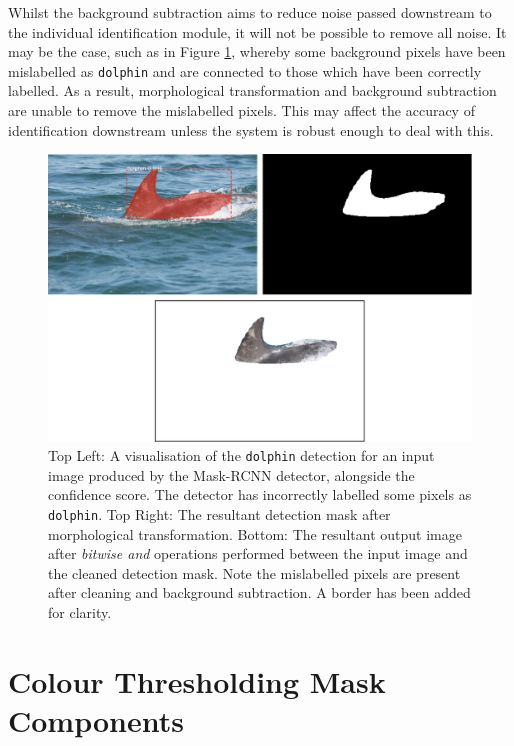 Whilst the background subtraction aims to reduce noise passed downstream to the individual identification module, it will not be possible to remove all noise. It may be the case, such as in Figure \ref{fig:fin-extraction-unclean}, whereby some background pixels have been mislabelled as \texttt{dolphin} and are connected to those which have been correctly labelled. As a result, morphological transformation and background subtraction are unable to remove the mislabelled pixels. This may affect the accuracy of identification downstream unless the system is robust enough to deal with this.

\begin{figure}
	\begin{center}
		\includegraphics[scale=0.5]{Chapter4/figs/fin-extraction-unclean-uncropped.png}
	\end{center}
	\caption{Top Left: A visualisation of the \texttt{dolphin} detection for an input image produced by the Mask-RCNN detector, alongside the confidence score. The detector has incorrectly labelled some pixels as \texttt{dolphin}. Top Right: The resultant detection mask after morphological transformation. Bottom: The resultant output image after \textit{bitwise and} operations performed between the input image and the cleaned detection mask. Note the mislabelled pixels are present after cleaning and background subtraction. A border has been added for clarity.}
	\label{fig:fin-extraction-unclean}
\end{figure}

\section{Colour Thresholding Mask Components}\label{ch:postProcessing,sec:colourThresholdingMaskComponents}

